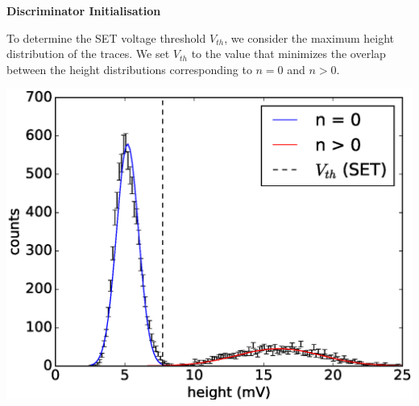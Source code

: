 \vspace{1cm}
\begin{center}
  \begin{center} {\bf \Large \textsf {Discriminator Initialisation}}\end{center}
\end{center}
To determine the SET voltage threshold $V_{th}$, 
we consider the maximum height distribution of the traces. 
%
We set $V_{th}$ to the value that minimizes the overlap between the height distributions corresponding to $n=0$ and $n>0$.

\begin{figurehere}
    \begin{center}
    \includegraphics[width=0.9\linewidth]{figures/height_histogram_cw/height_histo.eps}
    \end{center}
\end{figurehere}
